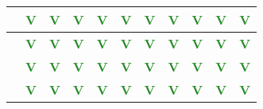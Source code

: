 \begin{frame}
{\begin{tabular}{|c||*{10}{c|}}
\hline
[344-443] & \textcolor{ForestGreen}{\textbf{V}} & \textcolor{ForestGreen}{\textbf{V}} & \textcolor{ForestGreen}{\textbf{V}} & \textcolor{ForestGreen}{\textbf{V}} & \textcolor{ForestGreen}{\textbf{V}} & \textcolor{ForestGreen}{\textbf{V}} & \textcolor{ForestGreen}{\textbf{V}} & \textcolor{ForestGreen}{\textbf{V}} & \textcolor{ForestGreen}{\textbf{V}} & \textcolor{ForestGreen}{\textbf{V}} \\
\hline
[443-577] & \textcolor{ForestGreen}{\textbf{V}} & \textcolor{ForestGreen}{\textbf{V}} & \textcolor{ForestGreen}{\textbf{V}} & \textcolor{ForestGreen}{\textbf{V}} & \textcolor{ForestGreen}{\textbf{V}} & \textcolor{ForestGreen}{\textbf{V}} & \textcolor{ForestGreen}{\textbf{V}} & \textcolor{ForestGreen}{\textbf{V}} & \textcolor{ForestGreen}{\textbf{V}} & \textcolor{ForestGreen}{\textbf{V}} \\
\hline
[577-606] & \textcolor{ForestGreen}{\textbf{V}} & \textcolor{ForestGreen}{\textbf{V}} & \textcolor{ForestGreen}{\textbf{V}} & \textcolor{ForestGreen}{\textbf{V}} & \textcolor{ForestGreen}{\textbf{V}} & \textcolor{ForestGreen}{\textbf{V}} & \textcolor{ForestGreen}{\textbf{V}} & \textcolor{ForestGreen}{\textbf{V}} & \textcolor{ForestGreen}{\textbf{V}} & \textcolor{ForestGreen}{\textbf{V}} \\
\hline
[606-1500] & \textcolor{ForestGreen}{\textbf{V}} & \textcolor{ForestGreen}{\textbf{V}} & \textcolor{ForestGreen}{\textbf{V}} & \textcolor{ForestGreen}{\textbf{V}} & \textcolor{ForestGreen}{\textbf{V}} & \textcolor{ForestGreen}{\textbf{V}} & \textcolor{ForestGreen}{\textbf{V}} & \textcolor{ForestGreen}{\textbf{V}} & \textcolor{ForestGreen}{\textbf{V}} & \textcolor{ForestGreen}{\textbf{V}} \\
\hline
\end{tabular}
}
\end{frame}
